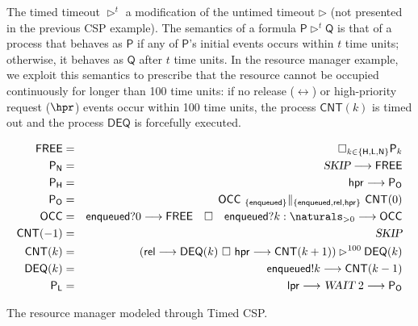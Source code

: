 \begin{example}
The timed timeout $\rhd^t$ a modification of the untimed timeout
$\rhd$ (not presented in the previous CSP example). The semantics of a
formula $\mathsf{P} \rhd^t \mathsf{Q}$ is that of a process that
behaves as $\mathsf{P}$ if any of $\mathsf{P}$'s initial events occurs
within $t$ time units; otherwise, it behaves as $\mathsf{Q}$ after $t$
time units. In the resource manager example, we exploit this semantics
to prescribe that the resource cannot be occupied continuously for
longer than 100 time units: if no release ($\rel$) or high-priority
request ($\hpr$) events occur within 100 time units, the process
$\mathsf{CNT}(k)$ is timed out and the process $\mathsf{DEQ}$ is
forcefully executed.
\begin{table}[tbh]
\begin{center}
\begin{eqnarray*}
  \mathsf{FREE}   &   =   &   \Box_{k \in \{\mathsf{H},\mathsf{L},\mathsf{N}\}} \mathsf{P}_{k}   \\
  \mathsf{P}_{\mathsf{N}}  &  =  &  \textsl{SKIP} \longrightarrow \mathsf{FREE} \\  
  \mathsf{P}_{\mathsf{H}}  &  =  &  \mathsf{hpr} \longrightarrow \mathsf{P}_\mathsf{O} \\
  \mathsf{P}_\mathsf{O}    &  = &  \mathsf{OCC} \ _{\{\mathsf{enqueued}\}}\Vert_{\{\mathsf{enqueued}, \mathsf{rel}, \mathsf{hpr}\}} \  \mathsf{CNT}(0) \\
  \mathsf{OCC}  &  =  &  \mathsf{enqueued}?0 \longrightarrow \mathsf{FREE} \quad \Box \quad \mathsf{enqueued}?k: \naturals_{> 0} \longrightarrow \mathsf{OCC} \\
  \mathsf{CNT}(-1) &  =  &  \textsl{SKIP} \\
  \mathsf{CNT}(k)  &  =  &  \left( \mathsf{rel} \longrightarrow \mathsf{DEQ}(k) \ \Box \ \mathsf{hpr} \longrightarrow \mathsf{CNT}(k+1) \right)
                                      \rhd^{100}  \mathsf{DEQ}(k) \\
  \mathsf{DEQ}(k)  &  =  &  \mathsf{enqueued}!k \longrightarrow \mathsf{CNT}(k-1) \\
  \mathsf{P}_{\mathsf{L}}  &  =  &  \mathsf{lpr} \longrightarrow \textsl{WAIT}\;2 \longrightarrow \mathsf{P}_\mathsf{O}
\end{eqnarray*}
\end{center}
\caption{The resource manager modeled through Timed CSP.}
\label{tab:timedCSP}
\end{table}
\end{example}

